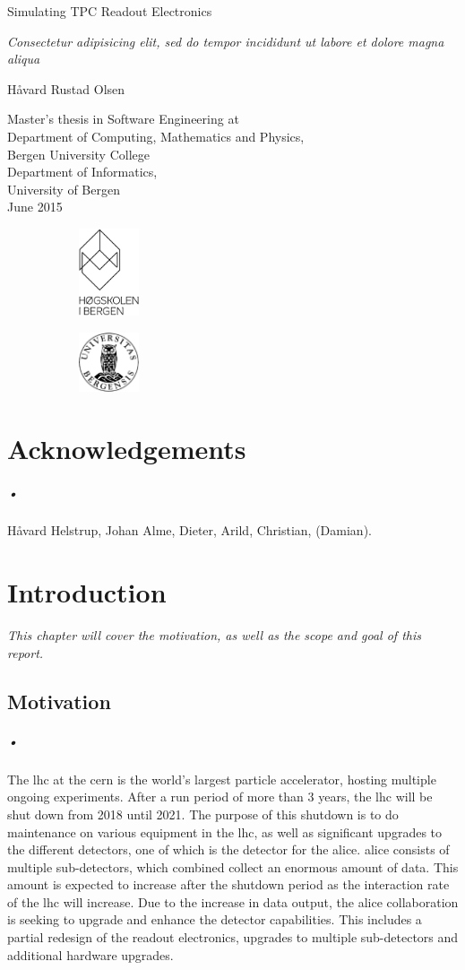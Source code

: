 \documentclass[a4paper, 12pt]{report}
\newcommand*{\titlePage}{\begingroup %
\fontfamily{phv}\selectfont
\centering %

\vspace{200pt}
{\Huge Simulating TPC Readout Electronics} \\ %
\vspace{5pt}

{\Large \textsl{Consectetur adipisicing elit, sed do tempor incididunt ut labore et dolore magna aliqua}} %
\vspace{50pt}

{\Large{H\r{a}vard Rustad Olsen}}\\ %

\vfill %

{\Large Master's thesis in Software Engineering at \\
\vspace{10pt}
Department of Computing, Mathematics and Physics, \\
Bergen University College \\
\vspace{10pt}
Department of  Informatics, \\
University of Bergen \\}
\vspace{10pt}
{\large June 2015} %


\begin{figure}[h]
		\begin{subfigure}[]{50pt}
			\includegraphics[width=50pt]{HIB_sort_hovedlogo.eps}
		\end{subfigure}
		\hfill
		\begin{subfigure}[]{50pt}
			\includegraphics[width=50pt]{uib-logo.eps}
		\end{subfigure}

\end{figure}

\endgroup}
\begin{document}
\pagestyle{empty} %

\titlePage %

\newpage


\chapter*{Acknowledgements}

\paragraph{•}
Håvard Helstrup, Johan Alme, Dieter, Arild, Christian, (Damian).
\newpage

{}
\tableofcontents

\newpage
{}
{}
\listoffigures

\newpage
{}
{}
\listoftables

\newpage
{}
{}
\lstlistoflistings
\newpage

\printglossaries
\newpage
\pagestyle{fancy}
\chapter{Introduction}
\textit{This chapter will cover the motivation, as well as the scope and goal of this report.}

\section{Motivation}
\label{sec:motivation}
\paragraph{•}
The \gls{lhc} at the \gls{cern} is the world's largest particle accelerator, hosting multiple ongoing experiments.
After a run period of more than 3 years, the \gls{lhc} will be shut down from 2018 until 2021.\cite{ls2}
The purpose of this shutdown is to do maintenance on various equipment in the \gls{lhc}, as well as significant upgrades to the different detectors, one of which is the detector for the \gls{alice}.
\gls{alice} consists of multiple sub-detectors, which combined collect an enormous amount of data.
This amount is expected to increase after the shutdown period as the interaction rate of the \gls{lhc} will increase.
Due to the increase in data output, the \gls{alice} collaboration is seeking to upgrade and enhance the detector capabilities.\cite{alice-upgrade}
This includes a partial redesign of the readout electronics, upgrades to multiple sub-detectors and additional hardware upgrades.
\end{document}
